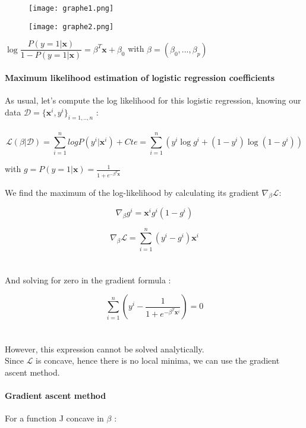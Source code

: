 \documentclass[a4paper,12pt]{article}
\newcommand{\dd}{\mathcal{D}}
\newcommand{\xx}{{\bm x}}
\begin{document}
\begin{figure}[H]
\centering
\begin{minipage}[b!]{0.4\textwidth}
\texttt{[image: graphe1.png]}
\end{minipage}
\hfill
\begin{minipage}[b!]{0.4\textwidth}
\texttt{[image: graphe2.png]}
\end{minipage}
\end{figure}
\begin{center}
\(\log \dfrac{P(y=1|\xx)}{1 - P(y=1|\xx)} = \beta^T\xx + \beta_0\) with \(\beta = (\beta_0, ..., \beta_p)\)\\
\end{center}

\paragraph{Maximum likelihood estimation of logistic regression coefficients}

As usual, let's compute the log likelihood for this logistic regression, knowing our data \(\dd = {\{\xx^i,\textit{y}^i\}}_{\textit{i}=1,..,\textit{n}}\)  :\\
\\
\[\mathcal{L}(\beta|\dd) = \displaystyle\sum_{i=1}^{n} log P(y^i|\xx^i) + Cte = \displaystyle\sum_{i=1}^{n} (y^i \log g^i + (1-y^i) \log(1-g^i))\]
\begin{center}
with \(g = P(y=1|\xx) = \frac{1}{1+e^{-\beta^T\xx}}\) 
\end{center}
We find the maximum of the log-likelihood by calculating its gradient \(\nabla_{\beta}\mathcal{L}\): 

\[\nabla_{\beta}g^i = \xx^i g^i (1-g^i)\]

\[\nabla_{\beta}\mathcal{L} = \displaystyle\sum_{i=1}^{n} (y^i-g^i)\xx^i\]\\
\\
And solving for zero in the gradient formula :

\[\displaystyle\sum_{i=1}^{n} \left( y^i - \frac{1}{1 + e^{-\beta^T\xx^i}} \right) = 0\]\\
\\
However, this expression cannot be solved analytically. \\ Since $\mathcal{L}$ is concave, hence there is no local minima, we can use the gradient ascent method.
\\
\paragraph{Gradient ascent method} For a function J concave in $\beta$ :
\end{document}
